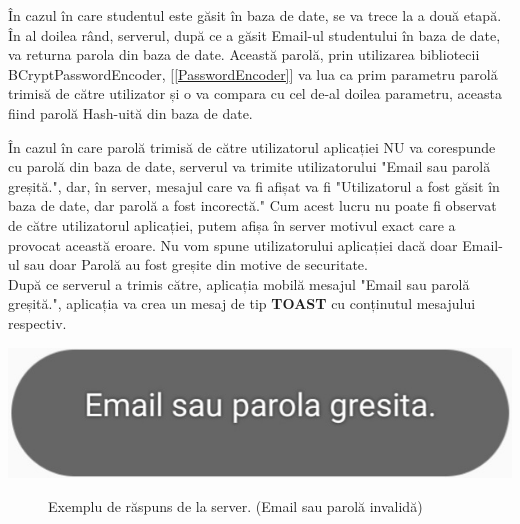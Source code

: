 \documentclass{article}
\begin{document}
		În cazul în care studentul este găsit în baza de date, se va trece la a două etapă. \\

	În al doilea rând, serverul, după ce a găsit Email-ul studentului în baza de date, va returna parola din baza de date. Această parolă, prin utilizarea bibliotecii BCryptPasswordEncoder, [\ref{PasswordEncoder}]
va lua ca prim parametru parolă trimisă de către utilizator și o va compara cu cel de-al doilea parametru, aceasta fiind parolă Hash-uită din baza de date.

		În cazul în care parolă trimisă de către utilizatorul aplicației NU va corespunde cu parolă din baza de date, serverul va trimite utilizatorului "Email sau parolă greșită.", dar, în server, mesajul care va fi afișat va fi "Utilizatorul a fost găsit în baza de date, dar parolă a fost incorectă." Cum acest lucru nu poate fi observat de către utilizatorul aplicației, putem afișa în server motivul exact care a provocat această eroare. Nu vom spune utilizatorului aplicației dacă doar Email-ul sau doar Parolă au fost greșite din motive de securitate. \\

		După ce serverul a trimis către, aplicația mobilă mesajul "Email sau parolă greșită.", aplicația va crea un mesaj de tip \textbf{TOAST} cu conținutul mesajului respectiv.

	\begin{center}
		\includegraphics[scale=0.25]{Source/AplicatieEmailGresit}
		\begin{figure}[!h]
			{\caption*{Exemplu de răspuns de la server. (Email sau parolă invalidă)}}
		\end{figure}
	\end{center}
\end{document}

